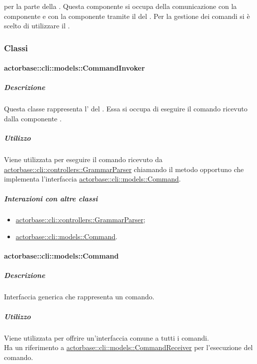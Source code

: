 \documentclass{scalatekids-article}
\begin{document}
 per la parte  della . Questa
componente si occupa della comunicazione con la componente  e
con la componente  tramite il  del  . Per la gestione dei comandi si è scelto di
utilizzare il .

\subsubsection{Classi}

\paragraph{actorbase::cli::models::CommandInvoker}
\label{sec:actorbase::cli::models::CommandInvoker}

\subparagraph{Descrizione}

Questa classe rappresenta l' del . Essa
si occupa di eseguire il comando ricevuto dalla componente .

\subparagraph{Utilizzo}

Viene utilizzata per eseguire il comando ricevuto da
\hyperref[sec:actorbase::cli::controllers::GrammarParser]{actorbase::cli::controllers::GrammarParser} chiamando il metodo opportuno che
implementa l'interfaccia \hyperref[sec:actorbase::cli::models::Command]{actorbase::cli::models::Command}.

\subparagraph{Interazioni con altre classi}

\begin{itemize}
\item \hyperref[sec:actorbase::cli::controllers::GrammarParser]{actorbase::cli::controllers::GrammarParser};
\item \hyperref[sec:actorbase::cli::models::Command]{actorbase::cli::models::Command}.
\end{itemize}

\paragraph{actorbase::cli::models::Command}
\label{sec:actorbase::cli::models::Command}

\subparagraph{Descrizione}

Interfaccia generica che rappresenta un comando.

\subparagraph{Utilizzo}

Viene utilizzata per offrire un'interfaccia comune a tutti i comandi.\\Ha un
riferimento a \hyperref[sec:actorbase::cli::models::CommandReceiver]{actorbase::cli::models::CommandReceiver} per l'esecuzione del
comando.
\end{document}
